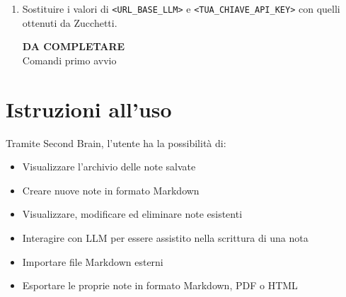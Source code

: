 \documentclass[a4paper,10pt]{article}
\begin{document}
\begin{enumerate}
\begin{lstlisting}
    MEMCACHED_HOST=127.0.0.1

    REDIS_CLIENT=phpredis
    REDIS_HOST=127.0.0.1
    REDIS_PASSWORD=null
    REDIS_PORT=6379

    MAIL_MAILER=log
    MAIL_SCHEME=null
    MAIL_HOST=127.0.0.1
    MAIL_PORT=2525
    MAIL_USERNAME=null
    MAIL_PASSWORD=null
    MAIL_FROM_ADDRESS="hello@example.com"
    MAIL_FROM_NAME="${APP_NAME}"

    AWS_ACCESS_KEY_ID=
    AWS_SECRET_ACCESS_KEY=
    AWS_DEFAULT_REGION=us-east-1
    AWS_BUCKET=
    AWS_USE_PATH_STYLE_ENDPOINT=false

    VITE_APP_NAME="${APP_NAME}"
    VITE_DEV_SERVER_URL=http://localhost:5173

    LLM_BASE_URL=<URL_BASE_LLM>
    LLM_API_KEY=<TUA_CHIAVE_API_KEY>
    # Modelli ['qwen3:30b','devstral:24b','gpt-oss:20b','gemma3:27b','gemma3:1b','deepseek-r1:8b','qwen3:1.7b']
    LLM_MODEL=gemma3:4b
  \end{lstlisting}

  \item Sostituire i valori di \verb|<URL_BASE_LLM>| e \verb|<TUA_CHIAVE_API_KEY>| con quelli ottenuti da Zucchetti.
  
  \begin{center}
    {\Huge \textbf{ DA COMPLETARE }}\\[1em]
    {\LARGE Comandi primo avvio}
  \end{center}

\end{enumerate}

\section{Istruzioni all'uso}
Tramite Second Brain, l'utente ha la possibilità di:
\begin{itemize}
    \item Visualizzare l'archivio delle note salvate
    \item Creare nuove note in formato Markdown
    \item Visualizzare, modificare ed eliminare note esistenti
    \item Interagire con LLM per essere assistito nella scrittura di una nota
    \item Importare file Markdown esterni
    \item Esportare le proprie note in formato Markdown, PDF o HTML
\end{itemize}
\end{document}
